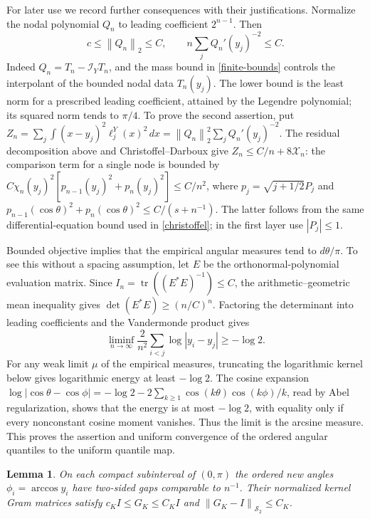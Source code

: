 \documentclass[a4paper,11pt]{amsart}
\newtheorem{lemma}[theorem]{Lemma}
\theoremstyle{remark}\newtheorem{remark}[theorem]{Remark}
\newcommand{\tr}{\operatorname{tr}}
\newcommand{\HS}{\mathcal S_2}
\newcommand{\dd}{\,d}
\newcommand{\norm}[1]{\left\lVert#1\right\rVert}
\begin{document}
For later use we record further consequences with their justifications.
Normalize the nodal polynomial $Q_n$ to leading coefficient $2^{n-1}$.
Then
\begin{equation}\label{Q-bounds}
 c\le\norm{Q_n}_2\le C,\qquad
 n\sum_jQ_n'(y_j)^{-2}\le C.
\end{equation}
Indeed $Q_n=T_n-\mathcal I_YT_n$, and the mass bound in
\eqref{finite-bounds} controls the interpolant of the bounded nodal
data $T_n(y_j)$. The lower bound is the least norm for a prescribed
leading coefficient, attained by the Legendre polynomial; its squared
norm tends to $\pi/4$. To prove the second assertion, put
$Z_n=\sum_j\int(x-y_j)^2\ell_j^Y(x)^2\dd x
 =\norm{Q_n}_2^2\sum_jQ_n'(y_j)^{-2}$.
The residual decomposition above and Christoffel--Darboux give
$Z_n\le C/n+8\mathscr X_n$:
the comparison term for a single node is bounded by
$C\chi_n(y_j)^2[p_{n-1}(y_j)^2+p_n(y_j)^2]\le C/n^2$,
where $p_j=\sqrt{j+1/2}P_j$ and
$p_{n-1}(\cos\theta)^2+p_n(\cos\theta)^2\le C/(s+n^{-1})$.
The latter follows from the same differential-equation bound used in
\eqref{christoffel}; in the first layer use $|P_j|\le1$.

Bounded objective implies that the empirical angular measures tend
to $d\theta/\pi$. To see this without a spacing assumption, let $E$
be the orthonormal-polynomial evaluation matrix. Since
$I_n=\tr((E^*E)^{-1})\le C$, the arithmetic--geometric mean inequality
gives $\det(E^*E)\ge(n/C)^n$.
Factoring the determinant into leading coefficients and the
Vandermonde product gives
\begin{equation*}
 \liminf_{n\to\infty}\frac2{n^2}\sum_{i<j}\log|y_i-y_j|
 \ge-\log2.
\end{equation*}
For any weak limit $\mu$ of the empirical measures, truncating the
logarithmic kernel below gives logarithmic energy at least $-\log2$.
The cosine expansion
$\log|\cos\theta-\cos\phi|
 =-\log2-2\sum_{k\ge1}\cos(k\theta)\cos(k\phi)/k$,
read by Abel regularization, shows that the energy is at most
$-\log2$, with equality only if every nonconstant cosine moment
vanishes. Thus the limit is the arcsine measure. This proves the
assertion and uniform convergence of the ordered angular quantiles
to the uniform quantile map.

\begin{lemma}\label{bulk-spacing}
On each compact subinterval of $(0,\pi)$ the ordered new angles
$\phi_i=\arccos y_i$ have two-sided gaps comparable to $n^{-1}$.
Their normalized kernel Gram matrices satisfy
$c_KI\le G_K\le C_KI$ and $\norm{G_K-I}_{\HS}\le C_K$.
\end{lemma}
\end{document}
